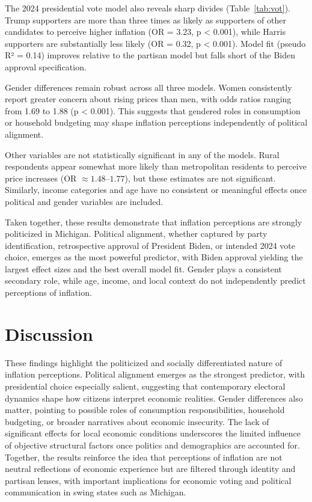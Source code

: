 \documentclass[preprint,12pt,authoryear]{elsarticle}
\begin{document}
The 2024 presidential vote model also reveals sharp divides (Table~\ref{tab:vot}). Trump supporters are more than three times as likely as supporters of other candidates to perceive higher inflation (OR = 3.23, p < 0.001), while Harris supporters are substantially less likely (OR = 0.32, p < 0.001). Model fit (pseudo R² = 0.14) improves relative to the partisan model but falls short of the Biden approval specification.

Gender differences remain robust across all three models. Women consistently report greater concern about rising prices than men, with odds ratios ranging from 1.69 to 1.88 (p < 0.001). This suggests that gendered roles in consumption or household budgeting may shape inflation perceptions independently of political alignment.

Other variables are not statistically significant in any of the models. Rural respondents appear somewhat more likely than metropolitan residents to perceive price increases (OR $\approx 1.48$--$1.77$), but these estimates are not significant. Similarly, income categories and age have no consistent or meaningful effects once political and gender variables are included.

Taken together, these results demonstrate that inflation perceptions are strongly politicized in Michigan. Political alignment, whether captured by party identification, retrospective approval of President Biden, or intended 2024 vote choice, emerges as the most powerful predictor, with Biden approval yielding the largest effect sizes and the best overall model fit. Gender plays a consistent secondary role, while age, income, and local context do not independently predict perceptions of inflation.


\section{Discussion}
These findings highlight the politicized and socially differentiated nature of inflation perceptions. Political alignment emerges as the strongest predictor, with presidential choice especially salient, suggesting that contemporary electoral dynamics shape how citizens interpret economic realities. Gender differences also matter, pointing to possible roles of consumption responsibilities, household budgeting, or broader narratives about economic insecurity. The lack of significant effects for local economic conditions underscores the limited influence of objective structural factors once politics and demographics are accounted for. Together, the results reinforce the idea that perceptions of inflation are not neutral reflections of economic experience but are filtered through identity and partisan lenses, with important implications for economic voting and political communication in swing states such as Michigan.
\end{document}
